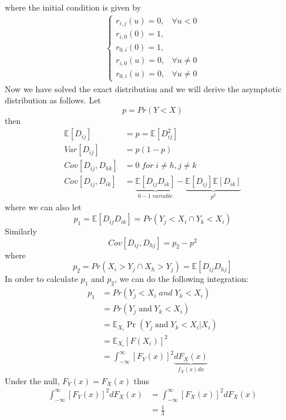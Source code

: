 \documentclass[twoside]{article}
\begin{document}
	where the initial condition is given by
	\begin{align*}
		\begin{cases}
			r_{i,j}(u) = 0, &\forall u < 0 \\
			r_{i,0}(0) = 1, \\
			r_{0,i}(0) = 1, \\
			r_{i,0}(u) = 0, &\forall u \neq 0 \\
			r_{0,i}(u) = 0, &\forall u \neq 0
		\end{cases}
	\end{align*}
	Now we have solved the exact distribution and we will derive the asymptotic distribution as follows. Let
	$$
	p = Pr \left( Y < X \right)
	$$
	then
	\begin{align*}
		\mathbb{E} \left[ D_{ij} \right] &= p = \mathbb{E} \left[ D_{ij}^2 \right] \\
		Var \left[ D_{ij} \right] &= p(1-p) \\
		Cov \left[ D_{ij}, D_{hk} \right] &= 0 \; for \; i \neq h, j \neq k \\
		Cov \left[ D_{ij}, D_{ik} \right] &= \underbrace{\mathbb{E} \left[ D_{ij}D_{ik} \right]}_{0-1 \; variable} - \underbrace{\mathbb{E} \left[ D_{ij} \right] \mathbb{E} \left[ D_{ik} \right]}_{p^2}
	\end{align*}
	where we can also let
	$$
	p_1 = \mathbb{E} \left[ D_{ij}D_{ik} \right] = Pr \left( Y_j < X_i \cap Y_k < X_i \right)
	$$
	Similarly
	$$
	Cov \left[ D_{ij}, D_{hj} \right] = p_2 - p^2
	$$
	where
	$$
	p_2 = Pr \left( X_i > Y_j \cap X_h > Y_j \right) = \mathbb{E} \left[ D_{ij} D_{hj} \right]
	$$
	In order to calculate $p_1$ and $p_2$, we can do the following integration: 
	\begin{align*}
		p_1 &= Pr \left( Y_j < X_i \; and \; Y_k < X_i \right) \\
		&= Pr \left( Y_j \; \mathrm{and} \; Y_k < X_i \right) \\
		&= \mathbb{E}_{X_i} \Pr \left( Y_j \; \mathrm{and} \; Y_k < X_i | X_i \right) \\
		&= \mathbb{E}_{X_i} [F(X_i)]^2 \\
		&= \int_{- \infty}^{\infty} \left[ F_Y(x) \right]^2 \underbrace{d F_X(x)}_{f_X(x)dx}
	\end{align*}
	Under the null, $F_Y(x) = F_X(x)$ thus
	\begin{align*}
		\int_{- \infty}^{\infty} \left[ F_Y(x) \right]^2 d F_X(x) &= \int_{- \infty}^{\infty} \left[ F_X(x) \right]^2 d F_X(x) \\
		&= \frac{1}{3}
	\end{align*}
\end{document}
